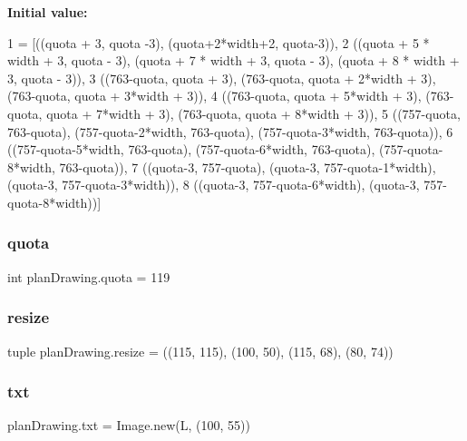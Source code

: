 {\bfseries Initial value\+:}
\begin{DoxyCode}
1 =  [((quota + 3, quota -3), (quota+2*width+2, quota-3)),
2           ((quota + 5 * width + 3, quota - 3), (quota + 7 * width + 3, quota - 3), (quota + 8 * width + 3, 
      quota - 3)),
3           ((763-quota, quota + 3), (763-quota, quota + 2*width + 3), (763-quota, quota + 3*width + 3)),
4           ((763-quota, quota + 5*width + 3), (763-quota, quota + 7*width + 3), (763-quota, quota + 8*width 
      + 3)),
5           ((757-quota, 763-quota), (757-quota-2*width, 763-quota), (757-quota-3*width, 763-quota)),
6           ((757-quota-5*width, 763-quota), (757-quota-6*width, 763-quota), (757-quota-8*width, 763-quota)),
7           ((quota-3, 757-quota), (quota-3, 757-quota-1*width), (quota-3, 757-quota-3*width)),
8           ((quota-3, 757-quota-6*width), (quota-3, 757-quota-8*width))]
\end{DoxyCode}
\mbox{\label{namespaceplan_drawing_a24a9f6fc7a9b6b3d6f1d1b8e0dd33e5d}} 
\subsubsection{\texorpdfstring{quota}{quota}}
{\footnotesize\ttfamily int plan\+Drawing.\+quota = 119}

\mbox{\label{namespaceplan_drawing_a2f2b30547094e0b1fdc9a9b6696d0083}} 
\subsubsection{\texorpdfstring{resize}{resize}}
{\footnotesize\ttfamily tuple plan\+Drawing.\+resize = ((115, 115), (100, 50), (115, 68), (80, 74))}

\mbox{\label{namespaceplan_drawing_a6353872188dfcfa8978c7abce9af330f}} 
\subsubsection{\texorpdfstring{txt}{txt}}
{\footnotesize\ttfamily plan\+Drawing.\+txt = Image.\+new(\textquotesingle{}L\textquotesingle{}, (100, 55))}

